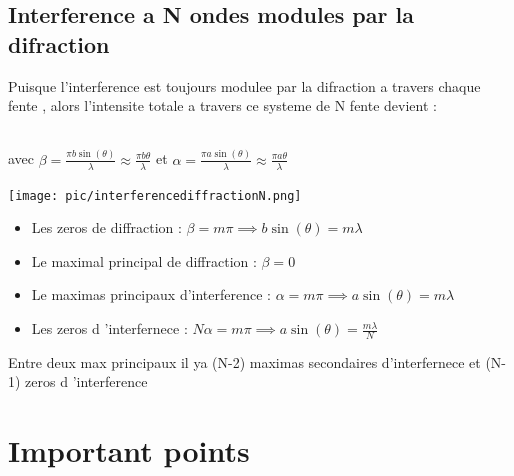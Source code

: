\documentclass[12pt]{book}
\begin{document}
        \section{Interference a N ondes modules par la difraction}
            Puisque l'interference est toujours modulee par la difraction a travers chaque fente , alors l'intensite totale a travers ce systeme de N fente devient : \\
                \begin{center}
                    \\ 
                    avec $\beta = \frac{\pi b \sin(\theta)}{\lambda}\approx\frac{\pi b \theta}{\lambda}$ et $\alpha = \frac{\pi a \sin(\theta)}{\lambda}\approx\frac{\pi a \theta}{\lambda}$
                \end{center}
                \begin{center}
                    \begin{minipage}{0.49\linewidth}
                        \texttt{[image: pic/interferencediffractionN.png]}
                    \end{minipage}
                    \begin{minipage}{0.49\linewidth}
                        \begin{itemize}
                            \item Les zeros de diffraction : $\beta = m\pi \implies b\sin(\theta)=m\lambda$
                            \item Le maximal principal de diffraction : $\beta = 0$
                            \item Le maximas principaux d'interference : $\alpha =m\pi \implies a\sin(\theta)=m\lambda $
                            \item Les zeros d 'interfernece : $N\alpha = m\pi \implies a\sin(\theta) = \frac{m\lambda}{N}$
                        \end{itemize}
                        Entre deux max principaux il ya (N-2) maximas secondaires d'interfernece et (N-1) zeros d 'interference
                    \end{minipage}
                \end{center}
    \chapter*{Important points}
\end{document}
